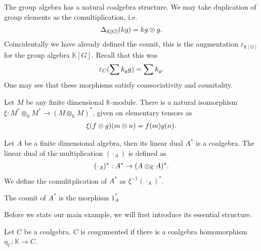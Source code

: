 \documentclass[../thesis.tex]{subfiles}
\begin{document}
            \begin{example}
                The group algebra has a natural coalgebra structure. We may take duplication of group elements as the comultiplication, i.e.
                \begin{align*}
                    \Delta_{\mathbb{K}[G]}(kg) = kg\otimes g\tt{.}
                \end{align*}
                Coincidentally we have already defined the counit, this is the augmentation $\varepsilon_{\mathbb{K}[G]}$ for the group algebra $\mathbb{K}[G]$. Recall that this was
                \begin{align*}
                    \varepsilon_C(\sum k_gg) = \sum k_g\tt{.}
                \end{align*}
                One may see that these morphisms satisfy coassociativity and counitality.
            \end{example}
            \begin{example}
                Let $M$ be any finite dimensional $\mathbb{K}$-module. There is a natural isomorphism $\xi : M^* \otimes_\mathbb{K} M^* \rightarrow (M \otimes_\mathbb{K} M)^*$, given on elementary tensors as
                \begin{align*}
                    \xi(f \otimes g)(m \otimes n) = f(m)g(n)\tt{.}
                \end{align*}

                Let $A$ be a finite dimensional algebra, then its linear dual $A^*$ is a coalgebra. The linear dual of the multiplication $(\cdot_A)$ is defined as 
                \begin{align*}
                    (\cdot_A)^* : A^* \rightarrow (A\otimes_\mathbb{K}A)^*\tt{.}
                \end{align*}
                We define the comulitplication of $A^*$ as $\xi^{-1}(\cdot_A)^*$.

                The counit of $A^*$ is the morphism $1_A^*$.
            \end{example}

            Before we state our main example, we will first introduce its essential structure.

            \begin{definition}
                Let $C$ be a coalgebra. $C$ is coagumented if there is a coalgebra homomorphism $\eta_C:\mathbb{K}\rightarrow C$.
            \end{definition}
\end{document}
